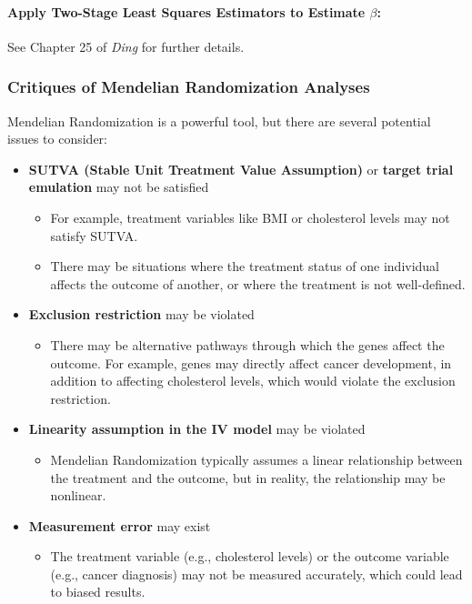 \paragraph*{Apply Two-Stage Least Squares Estimators to Estimate $\beta$:}
See Chapter 25 of \textit{Ding} for further details.


\subsubsection*{ Critiques of Mendelian Randomization Analyses}
Mendelian Randomization is a powerful tool, but there are several potential issues to consider:
\begin{itemize}
    \item \textbf{SUTVA (Stable Unit Treatment Value Assumption)} or \textbf{target trial emulation} may not be satisfied
    \begin{itemize}
        \item For example, treatment variables like BMI or cholesterol levels may not satisfy SUTVA.
        \item There may be situations where the treatment status of one individual affects the outcome of another, or where the treatment is not well-defined.
    \end{itemize}
    \item \textbf{Exclusion restriction} may be violated
    \begin{itemize}
        \item There may be alternative pathways through which the genes affect the outcome. For example, genes may directly affect cancer development, in addition to affecting cholesterol levels, which would violate the exclusion restriction.
    \end{itemize}
    \item \textbf{Linearity assumption in the IV model} may be violated
    \begin{itemize}
        \item Mendelian Randomization typically assumes a linear relationship between the treatment and the outcome, but in reality, the relationship may be nonlinear.
    \end{itemize}
    \item \textbf{Measurement error} may exist
    \begin{itemize}
        \item The treatment variable (e.g., cholesterol levels) or the outcome variable (e.g., cancer diagnosis) may not be measured accurately, which could lead to biased results.
    \end{itemize}
\end{itemize}


